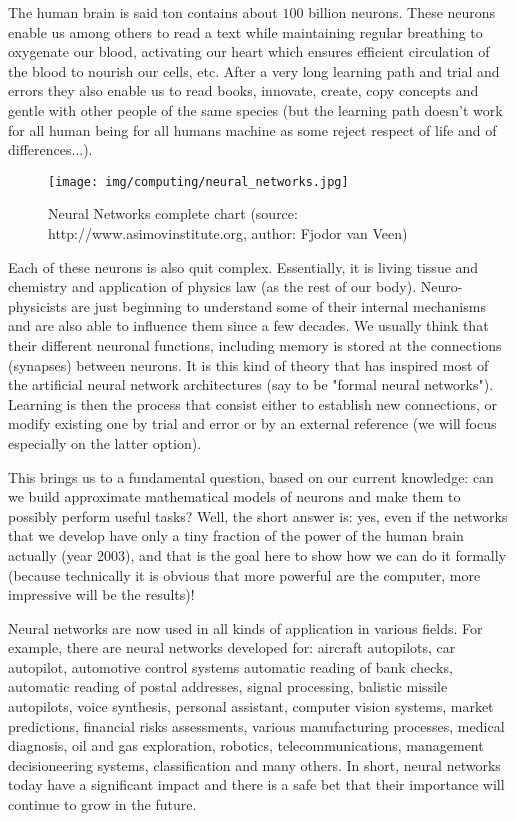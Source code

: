 	The human brain is said ton contains about $100$ billion neurons. These neurons enable us among others to read a text while maintaining regular breathing to oxygenate our blood, activating our heart which ensures efficient circulation of the blood to nourish our cells, etc. After a very long learning path and trial and errors they also enable us to read books, innovate, create, copy concepts and gentle with other people of the same species (but the learning path doesn't work for all human being for all humans machine as some reject respect of life and of differences...).
	\begin{figure}[H]
		\centering
	  	\texttt{[image: img/computing/neural\_networks.jpg]}
		\caption{Neural Networks complete chart (source: http://www.asimovinstitute.org, author: Fjodor van Veen)}
	\end{figure}
	Each of these neurons is also quit complex. Essentially, it is living tissue and chemistry and application of physics law (as the rest of our body). Neuro-physicists are just beginning to understand some of their internal mechanisms and are also able to influence them since a few decades. We usually think that their different neuronal functions, including memory is stored at the connections (synapses) between neurons. It is this kind of theory that has inspired most of the artificial neural network architectures (say to be "formal neural networks"). Learning is then the process that consist either to establish new connections, or modify existing one by trial and error or by an external reference (we will focus especially on the latter option).
	
	This brings us to a fundamental question, based on our current knowledge: can we build approximate mathematical models of neurons and make them to possibly perform useful tasks? Well, the short answer is: yes, even if the networks that we develop have only a tiny fraction of the power of the human brain actually (year 2003), and that is the goal here to show how we can do it formally (because technically it is obvious that more powerful are the computer, more impressive will be the results)!
	
	Neural networks are now used in all kinds of application in various fields. For example, there are neural networks developed for: aircraft autopilots, car autopilot, automotive control systems automatic reading of bank checks, automatic reading of postal addresses, signal processing, balistic missile autopilots, voice synthesis, personal assistant, computer vision systems, market predictions, financial risks assessments, various manufacturing processes, medical diagnosis, oil and gas exploration, robotics, telecommunications, management decisioneering systems, classification and many others. In short, neural networks today have a significant impact and there is a safe bet that their importance will continue to grow in the future.
	
